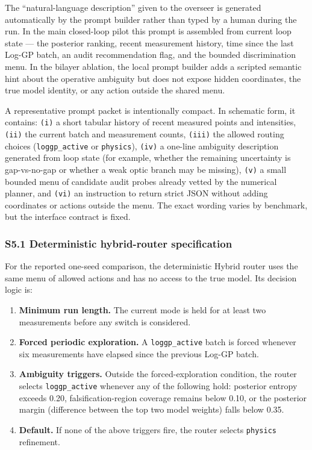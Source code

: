 \documentclass[
]{article}
\providecommand{\tightlist}{%
  \setlength{\itemsep}{0pt}\setlength{\parskip}{0pt}}
\begin{document}
The ``natural-language description'' given to the overseer is generated
automatically by the prompt builder rather than typed by a human during
the run. In the main closed-loop pilot this prompt is assembled from
current loop state --- the posterior ranking, recent measurement
history, time since the last Log-GP batch, an audit recommendation flag,
and the bounded discrimination menu. In the bilayer ablation, the local
prompt builder adds a scripted semantic hint about the operative
ambiguity but does not expose hidden coordinates, the true model
identity, or any action outside the shared menu.

A representative prompt packet is intentionally compact. In schematic
form, it contains: \texttt{(i)} a short tabular history of recent
measured points and intensities, \texttt{(ii)} the current batch and
measurement counts, \texttt{(iii)} the allowed routing choices
(\texttt{loggp\_active} or \texttt{physics}), \texttt{(iv)} a one-line
ambiguity description generated from loop state (for example, whether
the remaining uncertainty is gap-vs-no-gap or whether a weak optic
branch may be missing), \texttt{(v)} a small bounded menu of candidate
audit probes already vetted by the numerical planner, and \texttt{(vi)}
an instruction to return strict JSON without adding coordinates or
actions outside the menu. The exact wording varies by benchmark, but the
interface contract is fixed.

\hypertarget{s5.1-deterministic-hybrid-router-specification}{%
\subsubsection{S5.1 Deterministic hybrid-router
specification}\label{s5.1-deterministic-hybrid-router-specification}}

For the reported one-seed comparison, the deterministic Hybrid router
uses the same menu of allowed actions and has no access to the true
model. Its decision logic is:

\begin{enumerate}
\def\labelenumi{\arabic{enumi}.}
\tightlist
\item
  \textbf{Minimum run length.} The current mode is held for at least two
  measurements before any switch is considered.
\item
  \textbf{Forced periodic exploration.} A \texttt{loggp\_active} batch
  is forced whenever six measurements have elapsed since the previous
  Log-GP batch.
\item
  \textbf{Ambiguity triggers.} Outside the forced-exploration condition,
  the router selects \texttt{loggp\_active} whenever any of the
  following hold: posterior entropy exceeds 0.20, falsification-region
  coverage remains below 0.10, or the posterior margin (difference
  between the top two model weights) falls below 0.35.
\item
  \textbf{Default.} If none of the above triggers fire, the router
  selects \texttt{physics} refinement.
\end{enumerate}
\end{document}
